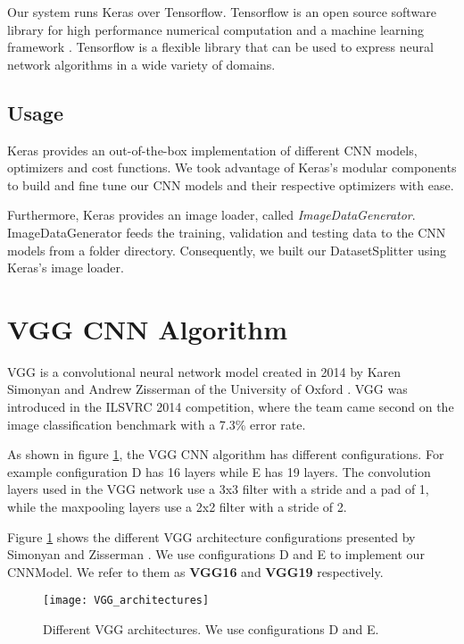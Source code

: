 Our system runs Keras over Tensorflow. Tensorflow is an open source software library for high performance numerical computation and a machine learning framework \cite{tensorflow2015-whitepaper}. Tensorflow is a flexible library that can be used to express neural network algorithms in a wide variety of domains.

\subsection{Usage}
Keras provides an out-of-the-box implementation of different CNN models, optimizers and cost functions. We took advantage of Keras's modular components to build and fine tune our CNN models and their respective optimizers with ease.

Furthermore, Keras provides an image loader, called \textit{ImageDataGenerator}. ImageDataGenerator feeds the training, validation and testing data to the CNN models from a folder directory. Consequently, we built our DatasetSplitter using Keras's image loader.


\section{VGG CNN Algorithm}\label{sec:vgg_algorithm}
VGG is a convolutional neural network model created in 2014 by Karen Simonyan and Andrew Zisserman of the University of Oxford \cite{simonyan2014very}. VGG was introduced in the ILSVRC 2014 competition, where the team came second on the image classification benchmark with a 7.3\% error rate.

As shown in figure \ref{fig:VGG_architectures}, the VGG CNN algorithm has different configurations. For example configuration D has 16 layers while E has 19 layers. The convolution layers used in the VGG network use a 3x3 filter with a stride and a pad of 1, while the maxpooling layers use a 2x2 filter with a stride of 2.

Figure \ref{fig:VGG_architectures} shows the different VGG architecture configurations presented by Simonyan and Zisserman \cite{simonyan2014very}. We use configurations D and E to implement our CNNModel. We refer to them as \textbf{VGG16} and \textbf{VGG19} respectively.

\begin{figure}[H]
\centering
  \texttt{[image: VGG\_architectures]}
\caption{Different VGG architectures. We use configurations D and E.}
\label{fig:VGG_architectures}
\end{figure}


